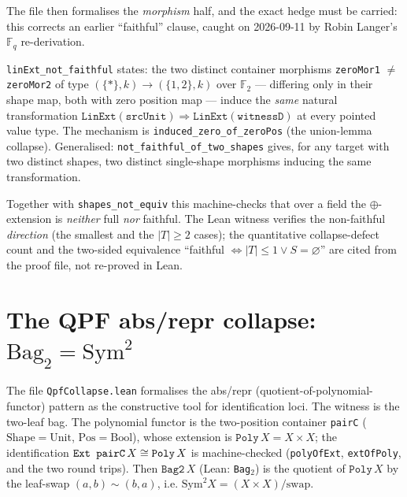 The file then formalises the \emph{morphism} half, and the exact hedge must be carried: this corrects an earlier ``faithful'' clause, caught on 2026-09-11 by Robin Langer's $\mathbb F_q$ re-derivation.

\begin{theorem}
\label{thm:leancob-notfaithful}
\texttt{linExt\_not\_faithful} states: the two distinct container morphisms \texttt{zeroMor1} $\neq$ \texttt{zeroMor2} of type $(\{\ast\},k)\to(\{1,2\},k)$ over $\mathbb F_2$ --- differing only in their shape map, both with zero position map --- induce the \emph{same} natural transformation $\texttt{LinExt}(\texttt{srcUnit})\Rightarrow\texttt{LinExt}(\texttt{witnessD})$ at every pointed value type. The mechanism is \texttt{induced\_zero\_of\_zeroPos} (the union-lemma collapse). Generalised: \texttt{not\_faithful\_of\_two\_shapes} gives, for any target with two distinct shapes, two distinct single-shape morphisms inducing the same transformation.
\end{theorem}

Together with \texttt{shapes\_not\_equiv} this machine-checks that over a field the $\oplus$-extension is \emph{neither} full \emph{nor} faithful. The Lean witness verifies the non-faithful \emph{direction} (the smallest and the $|T|\ge2$ cases); the quantitative collapse-defect count and the two-sided equivalence ``faithful $\iff |T|\le1\lor S=\varnothing$'' are cited from the proof file, not re-proved in Lean.

\section{The QPF abs/repr collapse: $\mathrm{Bag}_2=\mathrm{Sym}^2$}
\label{sec:leancob-qpf}

The file \texttt{QpfCollapse.lean} formalises the abs/repr (quotient-of-polynomial-functor) pattern as the constructive tool for identification loci. The witness is the two-leaf bag. The polynomial functor is the two-position container \texttt{pairC} ($\mathrm{Shape}=\mathrm{Unit}$, $\mathrm{Pos}=\mathrm{Bool}$), whose extension is $\texttt{Poly}\,X=X\times X$; the identification $\texttt{Ext pairC}\,X\cong\texttt{Poly}\,X$ is machine-checked (\texttt{polyOfExt}, \texttt{extOfPoly}, and the two round trips). Then $\texttt{Bag2}\,X$ (Lean: \texttt{Bag}$_2$) is the quotient of $\texttt{Poly}\,X$ by the leaf-swap $(a,b)\sim(b,a)$, i.e. $\mathrm{Sym}^2 X=(X\times X)/\mathrm{swap}$.

